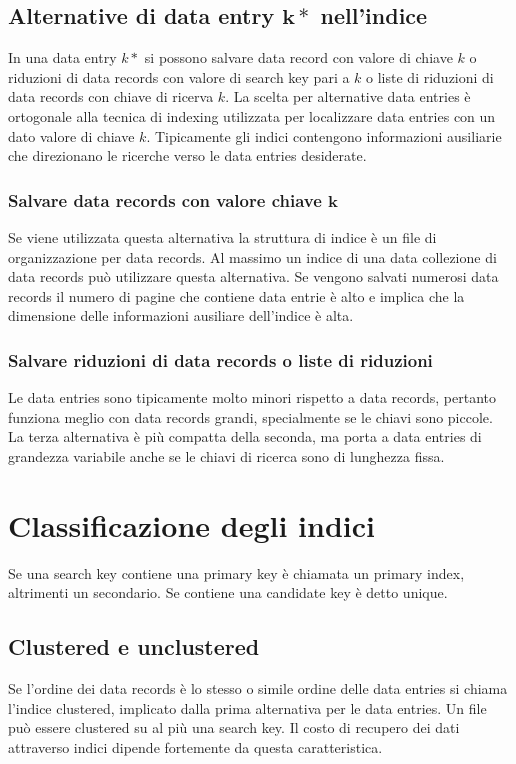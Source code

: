 \subsection{Alternative di data entry $\mathbf{k*}$ nell'indice}
In una data entry $k*$ si possono salvare data record con valore di chiave $k$ o riduzioni di data records con valore di search key pari a $k$ o liste di riduzioni di data records con chiave di ricerva $k$. La
scelta per alternative data entries \`e ortogonale alla tecnica di indexing utilizzata per localizzare data entries con un dato valore di chiave $k$. Tipicamente gli indici contengono informazioni ausiliarie che
direzionano le ricerche verso le data entries desiderate.
\subsubsection{Salvare data records con valore chiave $\mathbf{k}$}
Se viene utilizzata questa alternativa la struttura di indice \`e un file di organizzazione per data records. Al massimo un indice di una data collezione di data records pu\`o utilizzare questa alternativa. Se vengono
salvati numerosi data records il numero di pagine che contiene data entrie \`e alto e implica che la dimensione delle informazioni ausiliare dell'indice \`e alta. 
\subsubsection{Salvare riduzioni di data records o liste di riduzioni}
Le data entries sono tipicamente molto minori rispetto a data records, pertanto funziona meglio con data records grandi, specialmente se le chiavi sono piccole. La terza alternativa \`e pi\`u compatta della 
seconda, ma porta a data entries di grandezza variabile anche se le chiavi di ricerca sono di lunghezza fissa. 
\section{Classificazione degli indici}
Se una search key contiene una primary key \`e chiamata un primary index, altrimenti un secondario. Se contiene una candidate key \`e detto unique. 
\subsection{Clustered e unclustered}
Se l'ordine dei data records \`e lo stesso o simile ordine delle data entries si chiama l'indice clustered, implicato dalla prima alternativa per le data entries. Un file pu\`o essere clustered su al pi\`u una search key.
Il costo di recupero dei dati attraverso indici dipende fortemente da questa caratteristica.
